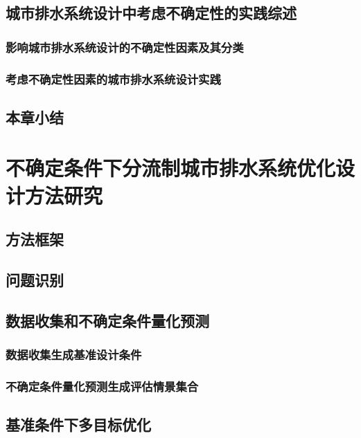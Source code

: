 \documentclass[degree=doctor]{thuthesis}
\begin{document}
\clearpage
\setcounter{page}{27}
\section{城市排水系统设计中考虑不确定性的实践综述}
\subsection{影响城市排水系统设计的不确定性因素及其分类}

\clearpage
\setcounter{page}{28}
\subsection{考虑不确定性因素的城市排水系统设计实践}

\clearpage
\setcounter{page}{38}
\section{本章小结}


\clearpage
\setcounter{page}{40}
\chapter{不确定条件下分流制城市排水系统优化设计方法研究}
\section{方法框架}

\clearpage
\setcounter{page}{41}
\section{问题识别}

\clearpage
\setcounter{page}{46}
\section{数据收集和不确定条件量化预测}
\subsection{数据收集生成基准设计条件}

\clearpage
\setcounter{page}{47}
\subsection{不确定条件量化预测生成评估情景集合}

\clearpage
\setcounter{page}{53}
\section{基准条件下多目标优化}
\end{document}
